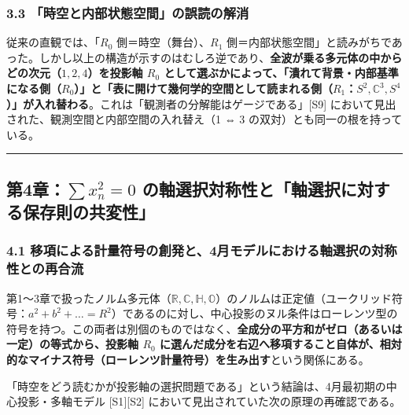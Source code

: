 \documentclass[
  a4paper,
]{ltjsarticle}
\begin{document}
\subsubsection{3.3
「時空と内部状態空間」の誤読の解消}\label{ux6642ux7a7aux3068ux5185ux90e8ux72b6ux614bux7a7aux9593ux306eux8aa4ux8aadux306eux89e3ux6d88}

従来の直観では、「\(R_0\) 側＝時空（舞台）、\(R_1\)
側＝内部状態空間」と読みがちであった。しかし以上の構造が示すのはむしろ逆であり、\textbf{全波が乗る多元体の中からどの次元（\(1, 2, 4\)）を投影軸
\(R_0\)
として選ぶかによって、「潰れて背景・内部基準になる側（\(R_0\)）」と「表に開けて幾何学的空間として読まれる側（\(R_1\)：\(S^2, \mathbb{C}^3, S^4\)）」が入れ替わる}。これは「観測者の分解能はゲージである」{[}S9{]}
において見出された、観測空間と内部空間の入れ替え（1 ⇔ 3
の双対）とも同一の根を持っている。

\begin{center}\rule{0.5\linewidth}{0.5pt}\end{center}

\subsection{\texorpdfstring{第4章：\(\sum x_n^2 = 0\)
の軸選択対称性と「軸選択に対する保存則の共変性」}{第4章：\textbackslash sum x\_n\^{}2 = 0 の軸選択対称性と「軸選択に対する保存則の共変性」}}\label{ux7b2c4ux7ae0sum-x_n2-0-ux306eux8ef8ux9078ux629eux5bfeux79f0ux6027ux3068ux8ef8ux9078ux629eux306bux5bfeux3059ux308bux4fddux5b58ux5247ux306eux5171ux5909ux6027}

\subsubsection{4.1
移項による計量符号の創発と、4月モデルにおける軸選択の対称性との再合流}\label{ux79fbux9805ux306bux3088ux308bux8a08ux91cfux7b26ux53f7ux306eux5275ux767aux30684ux6708ux30e2ux30c7ux30ebux306bux304aux3051ux308bux8ef8ux9078ux629eux306eux5bfeux79f0ux6027ux3068ux306eux518dux5408ux6d41}

第1〜3章で扱ったノルム多元体（\(\mathbb{R}, \mathbb{C}, \mathbb{H}, \mathbb{O}\)）のノルムは正定値（ユークリッド符号：\(a^2 + b^2 + \dots = R^2\)）であるのに対し、中心投影のヌル条件はローレンツ型の符号を持つ。この両者は別個のものではなく、\textbf{全成分の平方和がゼロ（あるいは一定）の等式から、投影軸
\(R_0\)
に選んだ成分を右辺へ移項すること自体が、相対的なマイナス符号（ローレンツ計量符号）を生み出す}という関係にある。

「時空をどう読むかが投影軸の選択問題である」という結論は、4月最初期の中心投影・多軸モデル
{[}S1{]}{[}S2{]} において見出されていた次の原理の再確認である。
\end{document}
